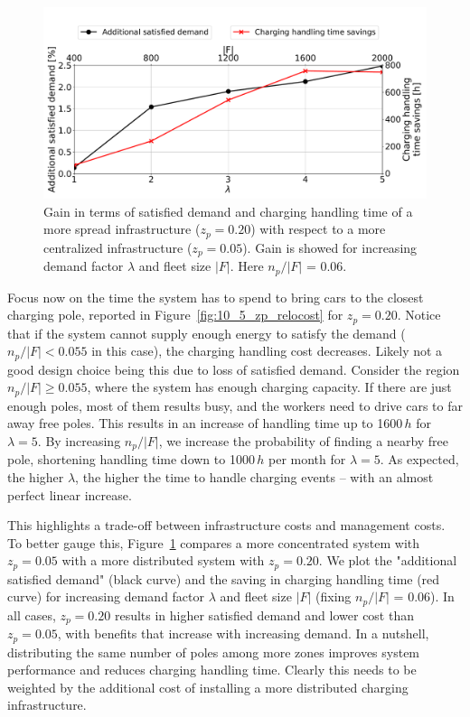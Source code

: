 \begin{figure}
\centering
\includegraphics[width=1.\linewidth]{fig/final/zp_gain.pdf}
\caption{Gain in terms of satisfied demand and charging handling time of a more spread infrastructure ($z_p = 0.20$) with respect to a more centralized infrastructure ($z_p = 0.05$). Gain is showed for increasing demand factor $\lambda$ and fleet size $|F|$. Here $n_p/|F|$ = 0.06.}
\label{fig:10_5_zp_gain}
\end{figure}

Focus now on the time the system has to spend to bring cars to the closest charging pole, reported in Figure~\ref{fig:10_5_zp_relocost} for $z_p=0.20$. 
Notice that if the system cannot supply enough energy to satisfy the demand ($n_p/|F|<0.055$ in this case), the charging handling cost decreases. Likely not a good design choice being this due to loss of satisfied demand.
Consider the region $n_p/|F|\geq 0.055$, where the system has enough charging capacity. If there are just enough poles, most of them results busy, and the workers need to drive cars to far away free poles. This results in an increase of handling time up to 1600\,$h$ for $\lambda=5$. By increasing $n_p/|F|$, we increase the probability of finding a nearby free pole, shortening handling time down to 1000\,$h$ per  month for $\lambda=5$.
As expected, the higher $\lambda$, the higher the time to handle charging events -- with an almost perfect linear increase.

This highlights a trade-off between infrastructure costs and management costs. To better gauge this, Figure~\ref{fig:10_5_zp_gain} compares a more concentrated system with $z_p=0.05$ with a more distributed system with $z_p=0.20$. We plot the "additional satisfied demand" (black curve) and the saving in charging handling time (red curve) for increasing demand factor $\lambda$ and fleet size $|F|$ (fixing $n_p/|F|$ = 0.06). In all cases, $z_p=0.20$ results in higher satisfied demand and lower cost than $z_p=0.05$, with benefits that increase with increasing demand. In a nutshell, distributing the same number of poles among more zones improves system performance and reduces charging handling time. Clearly this needs to be weighted by the additional cost of installing a more distributed charging infrastructure.

